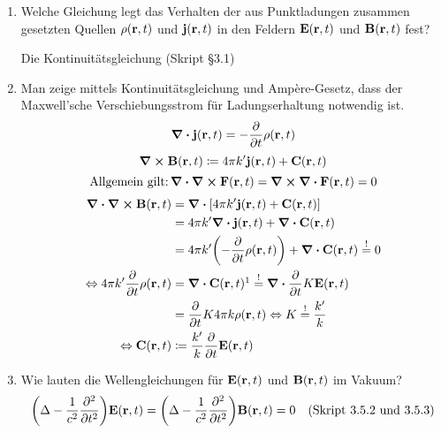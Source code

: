 \documentclass{scrartcl}
\newcommand{\ds}{\displaystyle}
\newcommand{\sref}[1]{(Skript #1)}
\newcommand{\smref}[1]{\quad\text{(Skript #1)}}
\begin{document}
\begin{enumerate}
    \item Welche Gleichung legt das Verhalten der aus Punktladungen
          zusammen gesetzten Quellen $\rho(\vb r, t)$ und 
          $\vb j(\vb r, t)$ in den Feldern $\vb E(\vb r, t)$
          und $\vb B(\vb r, t)$ fest?
          \begin{center}
            Die Kontinuitätsgleichung \sref{§3.1} 
          \end{center}

    \item Man zeige mittels Kontinuitätsgleichung und Ampère-Gesetz, 
          dass der Maxwell'sche Verschiebungsstrom für Ladungserhaltung
          notwendig ist.
          $$\div \vb j(\vb r, t) = -\pdv{t}\rho(\vb r ,t)$$
          $$\curl\vb B(\vb r, t) \coloneqq 
          4\pi k'\vb j(\vb r ,t) + \vb C(\vb r, t)$$
          $$\text{Allgemein gilt:}\,\div\curl\vb F(\vb r, t)
          =\curl \div \vb F(\vb r, t)=0$$
          \begin{equation*}
            \begin{split}
            \ds \div\curl\vb B(\vb r, t)
                        &\ds= \div \qty[
                        4\pi k'\vb j(\vb r, t)+\vb C(\vb r, t)]\\
                        &\ds= 4\pi k'\div\vb j(\vb r,t) +
                        \div \vb C(\vb r,t)\\
                        &\ds= 4\pi k'\qty(-\pdv{t}\rho(\vb r, t)) 
                        +\div \vb C(\vb r,t)\stackrel{!}{=}0\\
            \Leftrightarrow\ds 4\pi k'\pdv{t}\rho(\vb r, t) 
                        &\ds =\div \vb 
                        C(\vb r, t)\footnotemark
                        \stackrel{!}{=}\div \pdv{t}K\vb E(\vb r, t)\\
                        &\ds =\ds \pdv{t} 
                        K4\pi k \rho(\vb r, t)
            \Leftrightarrow K         
                        \stackrel{!}{=}\frac{k'}{k}\\
            \Leftrightarrow \vb C(\vb r,t)
                        &\coloneqq \frac{k'}{k}\pdv{t}\vb E(\vb r, t)
            \end{split}
          \end{equation*}

    \item Wie lauten die Wellengleichungen für $\vb E(\vb r, t)$ und
          $\vb B(\vb r, t)$ im Vakuum?
          $$\qty(\Delta - \frac{1}{c^2}\pdv[2]{t})\vb E(\vb r, t)=
          \qty(\Delta - \frac{1}{c^2}\pdv[2]{t})\vb B(\vb r, t)=0
          \smref{3.5.2 und 3.5.3}$$


\end{enumerate}
\end{document}
